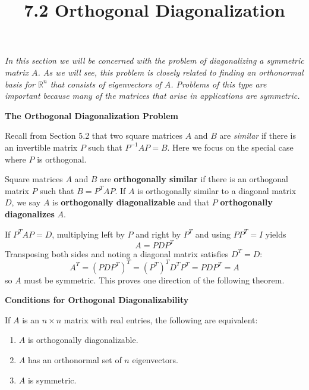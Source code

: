 \documentclass{article}
\title{7.2 Orthogonal Diagonalization}
\date{}
\author{}
\newcommand{\redheading}[1]{{\vspace{2mm}\noindent\Large\bfseries\color{red!55!black} #1\par}\vspace{2mm}}
\theoremstyle{mystyle}
\begin{document}
\maketitle

{\itshape\color{blue!45!black}
In this section we will be concerned with the problem of diagonalizing a symmetric
matrix $A$. As we will see, this problem is closely related to finding an orthonormal
basis for $\mathbb{R}^n$ that consists of eigenvectors of $A$. Problems of this type
are important because many of the matrices that arise in applications are symmetric.\par}

\vspace{2mm}

\redheading{The Orthogonal Diagonalization Problem}

Recall from Section 5.2 that two square matrices $A$ and $B$ are \emph{similar} if there
is an invertible matrix $P$ such that $P^{-1}AP = B$. Here we focus on the special case
where $P$ is orthogonal.

\begin{tcolorbox}[colback=teal!4, colframe=teal!65!black,
  title={\textbf{Definition 1}}, boxrule=0.5mm, arc=3mm]
Square matrices $A$ and $B$ are \textbf{orthogonally similar} if there is an orthogonal
matrix $P$ such that $B = P^T AP$. If $A$ is orthogonally similar to a diagonal matrix
$D$, we say $A$ is \textbf{orthogonally diagonalizable} and that $P$
\textbf{orthogonally diagonalizes} $A$.
\end{tcolorbox}

If $P^T AP = D$, multiplying left by $P$ and right by $P^T$ and using $PP^T = I$ yields
\begin{equation}
  A = PDP^T \tag{2}
\end{equation}
Transposing both sides and noting a diagonal matrix satisfies $D^T = D$:
\[
  A^T = (PDP^T)^T = (P^T)^T D^T P^T = PDP^T = A
\]
so $A$ must be symmetric. This proves one direction of the following theorem.

\redheading{Conditions for Orthogonal Diagonalizability}

\begin{tcolorbox}[colback=red!4, colframe=red!60!black,
  title={\textbf{Theorem 7.2.1}}, boxrule=0.5mm, arc=3mm]
If $A$ is an $n\times n$ matrix with real entries, the following are equivalent:
\begin{enumerate}
  \item[(a)] $A$ is orthogonally diagonalizable.
  \item[(b)] $A$ has an orthonormal set of $n$ eigenvectors.
  \item[(c)] $A$ is symmetric.
\end{enumerate}
\end{tcolorbox}
\end{document}
